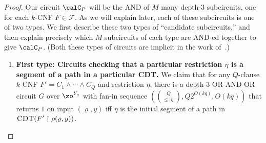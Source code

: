 \documentclass[11pt]{article}
\numberwithin{equation}{section}
\theoremstyle{definition}
\theoremstyle{plain}
\theoremstyle{plain}
\newcommand{\uhr}{\upharpoonright}
\newcommand{\CDT}{\textsc{CDT}}
\begin{document}
\begin{proof}
Our circuit $\calC_P$ will be the AND of $M$ many depth-$3$ subcircuits, one for each $k$-CNF $F \in \mathscr{F}$. As we will explain later, each of these subcircuits is one of two types. We first describe these two types of ``candidate subcircuits,'' and then explain precisely which $M$ subcircuits of each type are AND-ed together to give $\calC_P$. (Both these types of circuits are implicit in the work of~\cite{TX13}.) 

\begin{enumerate}

\item {\bf First type: Circuits  checking that a particular restriction $\eta$ is a segment of a path in a particular CDT.}  We claim that for any $Q$-clause $k$-CNF $F' = C_1 \wedge \cdots \wedge C_Q$ and restriction $\eta$, there is a depth-$3$ OR-AND-OR circuit $G$ over $\zo^{Y_q}$ with fan-in sequence $({Q\choose \le|\eta|}, Q2^{O(kq)},O(kq))$ that returns $1$ on input $(\varrho,y)$ iff $\eta$ is the initial segment of a path in $\CDT(F' \uhr \rho(\varrho,y))$. 


\end{enumerate}
\end{proof}
\end{document}
